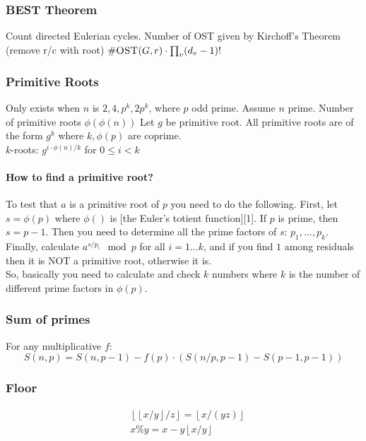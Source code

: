 \documentclass[15pt,a4paper]{article}
\begin{document}
\begin{landscape}
\begin{multicols*}{3}
\subsubsection{BEST Theorem}
Count directed Eulerian cycles. Number of OST given by
Kirchoff's Theorem (remove r/c with root) $\#\textsc{OST}(G,r)
\cdot \prod_{v}(d_v-1)!$

\subsubsection{Primitive Roots}
Only exists when $n$ is $2, 4, p^k, 2p^k$, where $p$ odd prime. Assume
$n$ prime. Number of primitive roots $\phi(\phi(n))$
Let $g$ be primitive root. All primitive roots are of the form $g^k$
where $k,\phi(p)$ are coprime.\\ $k$-roots:
$g^{i \cdot \phi(n) / k}$ for $0 \leq i < k$
\paragraph{How to find a primitive root?}
To test that $a$ is a primitive root of $p$ you need to do the following. First, let $s=\phi(p)$ where $\phi()$ is [the Euler's totient function][1]. If $p$ is prime, then $s=p-1$. Then you need to determine all the prime factors of $s$: $p_1,\ldots,p_k$. Finally, calculate $a^{s/p_i}\mod p$ for all $i=1\ldots k$, and if you find $1$ among residuals then it is NOT a primitive root, otherwise it is.\\
So, basically you need to calculate and check $k$ numbers where $k$ is the number of different prime factors in $\phi(p)$.
\subsubsection{Sum of primes} For any multiplicative $f$:
\[
S(n,p) = S(n, p-1) - f(p) \cdot (S(n/p,p-1) - S(p-1,p-1))
\]

\subsubsection{Floor}
\begin{align*}
&\left\lfloor \left\lfloor x/y \right\rfloor / z \right\rfloor = \left\lfloor x / (yz) \right\rfloor \\
&x \% y = x - y \left\lfloor x / y \right\rfloor
\end{align*}

\clearpage
\end{multicols*}
\endgroup
\end{landscape}
\end{document}
